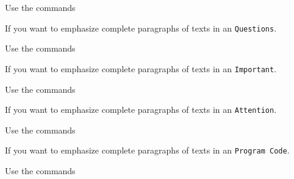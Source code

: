 \documentclass[graybox]{svmult}
\begin{document}
\begin{refguide}
\begin{sloppy}
Use the commands

\cprotect{}

If you want to emphasize complete paragraphs of texts in an \verb|Questions|.  

\eject

Use the commands

\cprotect{}

If you want to emphasize complete paragraphs of texts in an \verb|Important|.  

Use the commands

\cprotect{}

If you want to emphasize complete paragraphs of texts in an \verb|Attention|.  


Use the commands

\cprotect{}

If you want to emphasize complete paragraphs of texts in an \verb|Program Code|.  

Use the commands

\cprotect{}


\end{sloppy}
\end{refguide}
\end{document}
